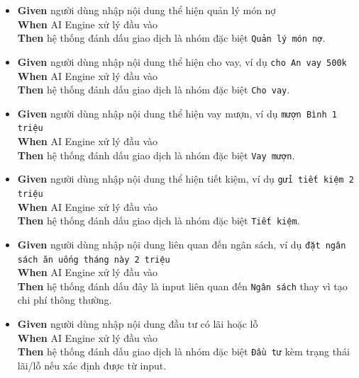\begin{itemize}
\item \textbf{Given} người dùng nhập nội dung thể hiện quản lý món nợ  \\ \hspace*{1.5em}  \textbf{When} AI Engine xử lý đầu vào  \\ \hspace*{1.5em}  \textbf{Then} hệ thống đánh dấu giao dịch là nhóm đặc biệt \texttt{Quản lý món nợ}.
\item \textbf{Given} người dùng nhập nội dung thể hiện cho vay, ví dụ \texttt{cho An vay 500k}  \\ \hspace*{1.5em}  \textbf{When} AI Engine xử lý đầu vào  \\ \hspace*{1.5em}  \textbf{Then} hệ thống đánh dấu giao dịch là nhóm đặc biệt \texttt{Cho vay}.
\item \textbf{Given} người dùng nhập nội dung thể hiện vay mượn, ví dụ \texttt{mượn Bình 1 triệu}  \\ \hspace*{1.5em}  \textbf{When} AI Engine xử lý đầu vào  \\ \hspace*{1.5em}  \textbf{Then} hệ thống đánh dấu giao dịch là nhóm đặc biệt \texttt{Vay mượn}.
\item \textbf{Given} người dùng nhập nội dung thể hiện tiết kiệm, ví dụ \texttt{gửi tiết kiệm 2 triệu}  \\ \hspace*{1.5em}  \textbf{When} AI Engine xử lý đầu vào  \\ \hspace*{1.5em}  \textbf{Then} hệ thống đánh dấu giao dịch là nhóm đặc biệt \texttt{Tiết kiệm}.
\item \textbf{Given} người dùng nhập nội dung liên quan đến ngân sách, ví dụ \texttt{đặt ngân sách ăn uống tháng này 2 triệu}  \\ \hspace*{1.5em}  \textbf{When} AI Engine xử lý đầu vào  \\ \hspace*{1.5em}  \textbf{Then} hệ thống đánh dấu đây là input liên quan đến \texttt{Ngân sách} thay vì tạo chi phí thông thường.
\item \textbf{Given} người dùng nhập nội dung đầu tư có lãi hoặc lỗ  \\ \hspace*{1.5em}  \textbf{When} AI Engine xử lý đầu vào  \\ \hspace*{1.5em}  \textbf{Then} hệ thống đánh dấu giao dịch là nhóm đặc biệt \texttt{Đầu tư} kèm trạng thái lãi/lỗ nếu xác định được từ input.

\end{itemize}
